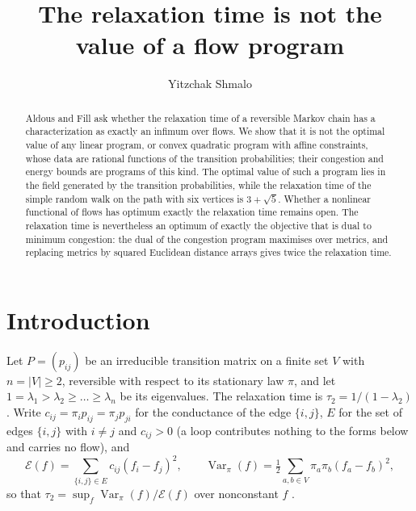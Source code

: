 \documentclass[11pt]{amsart}
\title{The relaxation time is not the value of a flow program}
\author{Yitzchak Shmalo}
\theoremstyle{remark}
\numberwithin{equation}{section}
\begin{document}
\begin{abstract}
Aldous and Fill ask whether the relaxation time of a reversible Markov chain has a characterization as exactly an infimum over flows. We show that it is not the optimal value of any linear program, or convex quadratic program with affine constraints, whose data are rational functions of the transition probabilities; their congestion and energy bounds are programs of this kind. The optimal value of such a program lies in the field generated by the transition probabilities, while the relaxation time of the simple random walk on the path with six vertices is $3+\sqrt5$. Whether a nonlinear functional of flows has optimum exactly the relaxation time remains open. The relaxation time is nevertheless an optimum of exactly the objective that is dual to minimum congestion: the dual of the congestion program maximises over metrics, and replacing metrics by squared Euclidean distance arrays gives twice the relaxation time.
\end{abstract}
\maketitle

\section{Introduction}

Let $P=(p_{ij})$ be an irreducible transition matrix on a finite set $V$ with $n=|V|\ge2$, reversible with respect to its stationary law $\pi$, and let $1=\lambda_1>\lambda_2\ge\dots\ge\lambda_n$ be its eigenvalues. The relaxation time is $\tau_2=1/(1-\lambda_2)$. Write $c_{ij}=\pi_ip_{ij}=\pi_jp_{ji}$ for the conductance of the edge $\{i,j\}$, $E$ for the set of edges $\{i,j\}$ with $i\ne j$ and $c_{ij}>0$ (a loop contributes nothing to the forms below and carries no flow), and
\[
\mathcal E(f)=\sum_{\{i,j\}\in E}c_{ij}(f_i-f_j)^2,\qquad
\operatorname{Var}_\pi(f)=\tfrac12\sum_{a,b\in V}\pi_a\pi_b(f_a-f_b)^2 ,
\]
so that $\tau_2=\sup_f \operatorname{Var}_\pi(f)/\mathcal E(f)$ over nonconstant $f$ \cite[Ch.~3]{AF}.
\end{document}
